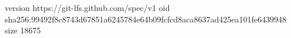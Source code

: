 version https://git-lfs.github.com/spec/v1
oid sha256:99492f8c8743d67851a6245784e64b09fcfcd8aca8637ad425ea101fe6439948
size 18675
